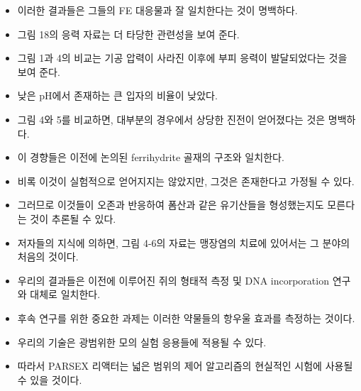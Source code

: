 \documentclass[10pt]{report}
\begin{document}
\begin{itemize}
		\item 이러한 결과들은 그들의 FE 대응물과 잘 일치한다는 것이 명백하다.
		\item 그림 18의 응력 자료는 더 타당한 관련성을 보여 준다.
		\item 그림 1과 4의 비교는 기공 압력이 사라진 이후에 부피 응력이 발달되었다는 것을 보여 준다. %
		\item 낮은 pH에서 존재하는 큰 입자의 비율이 낮았다.
		\item 그림 4와 5를 비교하면, 대부분의 경우에서 상당한 진전이 얻어졌다는 것은 명백하다.
		\item 이 경향들은 이전에 논의된 ferrihydrite 골재의 구조와 일치한다.
		\item 비록 이것이 실험적으로 얻어지지는 않았지만, 그것은 존재한다고 가정될 수 있다.
		\item 그러므로 이것들이 오존과 반응하여 폼산과 같은 유기산들을 형성했는지도 모른다는 것이 추론될 수 있다.
		\item 저자들의 지식에 의하면, 그림 4-6의 자료는 맹장염의 치료에 있어서는 그 분야의 처음의 것이다. 
		\item 우리의 결과들은 이전에 이루어진 쥐의 형태적 측정 및 DNA incorporation 연구와 대체로 일치한다.
		\item 후속 연구를 위한 중요한 과제는 이러한 약물들의 항우울 효과를 측정하는 것이다.
		\item 우리의 기술은 광범위한 모의 실험 응용들에 적용될 수 있다.
		\item 따라서 PARSEX 리액터는 넓은 범위의 제어 알고리즘의 현실적인 시험에 사용될 수 있을 것이다.
	\end{itemize}
	
\end{document}
